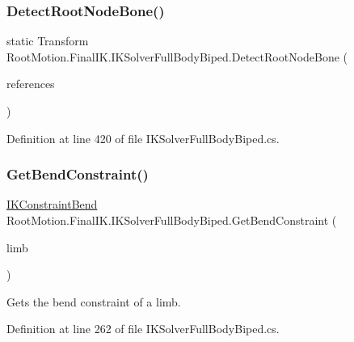 \subsubsection{\texorpdfstring{Detect\+Root\+Node\+Bone()}{DetectRootNodeBone()}}
{\footnotesize\ttfamily static Transform Root\+Motion.\+Final\+I\+K.\+I\+K\+Solver\+Full\+Body\+Biped.\+Detect\+Root\+Node\+Bone (\begin{DoxyParamCaption}\item[{\mbox{\hyperlink{class_root_motion_1_1_biped_references}{Biped\+References}}}]{references }\end{DoxyParamCaption})\hspace{0.3cm}{\ttfamily [static]}}



Definition at line 420 of file I\+K\+Solver\+Full\+Body\+Biped.\+cs.

\mbox{\label{class_root_motion_1_1_final_i_k_1_1_i_k_solver_full_body_biped_a44ea8d0cd6aee4c78d22f5c1d9732d5c}} 
\subsubsection{\texorpdfstring{Get\+Bend\+Constraint()}{GetBendConstraint()}}
{\footnotesize\ttfamily \mbox{\hyperlink{class_root_motion_1_1_final_i_k_1_1_i_k_constraint_bend}{I\+K\+Constraint\+Bend}} Root\+Motion.\+Final\+I\+K.\+I\+K\+Solver\+Full\+Body\+Biped.\+Get\+Bend\+Constraint (\begin{DoxyParamCaption}\item[{\mbox{\hyperlink{namespace_root_motion_1_1_final_i_k_ae8848c0353270a08dcfe8b85a5c9b761}{Full\+Body\+Biped\+Chain}}}]{limb }\end{DoxyParamCaption})}



Gets the bend constraint of a limb. 



Definition at line 262 of file I\+K\+Solver\+Full\+Body\+Biped.\+cs.

\mbox{\label{class_root_motion_1_1_final_i_k_1_1_i_k_solver_full_body_biped_a8b377dae8738c5a77ff88bf4bb5c8087}} 

